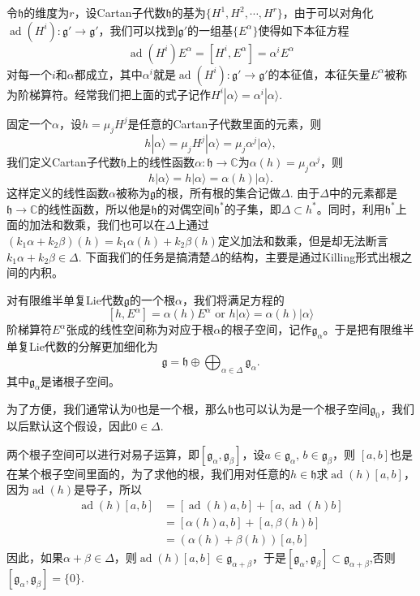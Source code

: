 \documentclass[9pt]{extarticle}
\newcommand{\cc}{\mathbb{C}}
\newcommand{\lag}{{\mathfrak{g}}}
\DeclareMathOperator{\ad}{ad}
\begin{document}
令$\mathfrak{h}$的维度为$r$，设Cartan子代数$\mathfrak{h}$的基为$\{H^1,H^2,\cdots,H^r\}$，由于可以对角化$\ad(H^i):\lag'\to\lag'$，我们可以找到$\lag'$的一组基$\{E^\alpha\}$使得如下本征方程
\[
	\ad(H^i)E^\alpha=[H^i,E^\alpha]=\alpha^iE^\alpha
\]
对每一个$i$和$\alpha$都成立，其中$\alpha^i$就是$\ad(H^i):\lag'\to \lag'$的本征值，本征矢量$E^\alpha$被称为阶梯算符。经常我们把上面的式子记作$H^i|\alpha\rangle=\alpha^i|\alpha\rangle$.


固定一个$\alpha$，设$h=\mu_jH^j$是任意的Cartan子代数里面的元素，则
\[
	h|\alpha\rangle=\mu_jH^j|\alpha\rangle=\mu_j\alpha^j|\alpha\rangle,
\]
我们定义Cartan子代数$\mathfrak{h}$上的线性函数$\alpha:\mathfrak{h}\to\cc$为$\alpha(h)=\mu_j\alpha^j$，则
\[
	h|\alpha\rangle=h|\alpha\rangle=\alpha(h)|\alpha\rangle.
\]
这样定义的线性函数$\alpha$被称为$\lag$的根，所有根的集合记做$\Delta$. 由于$\Delta$中的元素都是$\mathfrak{h}\to \cc$的线性函数，所以他是$\mathfrak{h}$的对偶空间$\mathfrak{h}^*$的子集，即$\Delta\subset h^*$。同时，利用$\mathfrak{h}^*$上面的加法和数乘，我们也可以在$\Delta$上通过$(k_1\alpha+k_2\beta)(h)=k_1\alpha(h)+k_2\beta(h)$定义加法和数乘，但是却无法断言$k_1\alpha+k_2\beta\in \Delta$. 下面我们的任务是搞清楚$\Delta$的结构，主要是通过Killing形式出根之间的内积。

\para 对有限维半单复Lie代数$\lag$的一个根$\alpha$，我们将满足方程的
\[
	[h,E^\alpha]=\alpha(h)E^\alpha\text{ or } h|\alpha\rangle=\alpha(h)|\alpha\rangle
\]
阶梯算符$E^\alpha$张成的线性空间称为对应于根$\alpha$的根子空间，记作$\lag_{\alpha}$。于是把有限维半单复Lie代数的分解更加细化为
\[
	\lag=\mathfrak{h}\oplus \bigoplus_{\alpha\in\Delta} \lag_\alpha.
\]
其中$\lag_\alpha$是诸根子空间。

为了方便，我们通常认为$0$也是一个根，那么$\mathfrak{h}$也可以认为是一个根子空间$\lag_0$，我们以后默认这个假设，因此$0\in\Delta$.

\para 两个根子空间可以进行对易子运算，即$[\lag_\alpha,\lag_\beta]$，设$a\in\lag_\alpha$, $b\in\lag_\beta$，则
$[a,b]$也是在某个根子空间里面的，为了求他的根，我们用对任意的$h\in \mathfrak{h}$求$\ad(h)[a,b]$，因为$\ad(h)$是导子，所以
\[
	\begin{split}
		\ad(h)[a,b]&=[\ad(h)a,b]+[a,\ad(h)b]\\
		&=[\alpha(h)a,b]+[a,\beta(h)b]\\
		&=(\alpha(h)+\beta(h))[a,b]
	\end{split}
\]
因此，如果$\alpha+\beta\in\Delta$，则$\ad(h)[a,b]\in \lag_{\alpha+\beta}$，于是$[\lag_\alpha,\lag_\beta]\subset \lag_{\alpha+\beta}$,否则$[\lag_\alpha,\lag_\beta]=\{0\}$.
\end{document}
